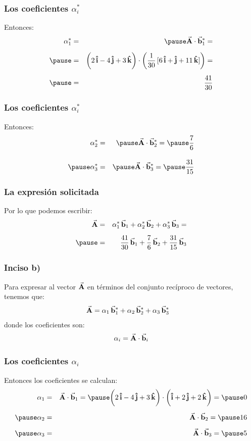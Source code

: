 \documentclass[12pt]{beamer}
\begin{document}
\begin{frame}
\frametitle{Los coeficientes $\alpha_{i}^{*}$}
Entonces:
\begin{eqnarray*}
\alpha_{1}^{*} &=& \pause \va{A} \cdot \va{b}_{1}^{*} = \\[0.5em] \pause
&=& \bigg( 2 \, \vu{i} - 4 \, \vu{j} + 3 \, \vu{k} \bigg) \cdot \bigg( \dfrac{1}{30} \, [6 \, \vu{i} + \vu{j} + 11 \, \vu{k}] \bigg) = \\[0.5em] \pause
&=& \dfrac{41}{30}
\end{eqnarray*}
\end{frame}
\begin{frame}
\frametitle{Los coeficientes $\alpha_{i}^{*}$}
Entonces:
\begin{eqnarray*}
\alpha_{2}^{*} &=& \pause \va{A} \cdot \va{b}_{2}^{*} =  \pause \dfrac{7}{6} \\[1em] \pause
\alpha_{3}^{*} &=& \pause \va{A} \cdot \va{b}_{3}^{*} =  \pause \dfrac{31}{15}
\end{eqnarray*}
\end{frame}
\begin{frame}
\frametitle{La expresión solicitada}
Por lo que podemos escribir:
\begin{eqnarray*}
\va{A} &=&  \alpha_{1}^{*} \, \va{b}_{1} + \alpha_{2}^{*} \, \va{b}_{2} + \alpha_{3}^{*} \, \va{b}_{3} = \\[0.5em] \pause
&=&  \dfrac{41}{30} \, \va{b}_{1} + \dfrac{7}{6} \, \va{b}_{2} + \dfrac{31}{15} \, \va{b}_{3}
\end{eqnarray*}
\end{frame}
\begin{frame}
\frametitle{Inciso b)}
Para expresar al vector $\va{A}$ en términos del conjunto recíproco de vectores, tenemos que:
\pause
\begin{align*}
\va{A} &=  \alpha_{1} \, \va{b}_{1}^{*} + \alpha_{2} \, \va{b}_{2}^{*} + \alpha_{3} \, \va{b}_{3}^{*}
\end{align*}
\pause
donde los coeficientes son:
\pause
\begin{align*}
\alpha_{i} = \va{A} \cdot \va{b}_{i}
\end{align*}
\end{frame}
\begin{frame}
\frametitle{Los coeficientes $\alpha_{i}$}
Entonces los coeficientes se calculan:
\begin{eqnarray*}
\alpha_{1} &=& \va{A} \cdot \va{b}_{1} = \pause \bigg( 2 \, \vu{i} - 4 \, \vu{j} + 3 \, \vu{k} \bigg) \cdot \bigg( \vu{i} + 2 \, \vu{j} + 2 \, \vu{k} \bigg) = \pause 0 \\[0.5em] \pause
\alpha_{2} &=& \va{A} \cdot \va{b}_{2} = \pause 16 \\[0.5em] \pause
\alpha_{3} &=& \va{A} \cdot \va{b}_{3} = \pause 5
\end{eqnarray*}
\end{frame}
\end{document}
